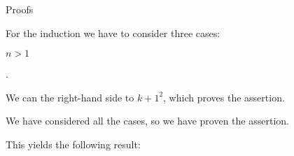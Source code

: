 \begin{sfragment}{Proofs}
\begin{latexcode}
\begin{sproof}[id=simple-proof]
\begin{spfcases}{For the induction we have to consider three cases:}
\begin{spfcase}{$n>1$}
\begin{spfstep}
        .
      \end{spfstep}
      \begin{spfstep}[type=conclusion]
        We can  the right-hand side to
        ${k+1}^2$, which proves the assertion.
      \end{spfstep}
   \end{spfcase}
    \begin{spfstep}[type=conclusion]
      We have considered all the cases, so we have proven the assertion.
    \end{spfstep}
  \end{spfcases}
\end{sproof}
\end{latexcode}

This yields the following result: 


\end{sfragment}
